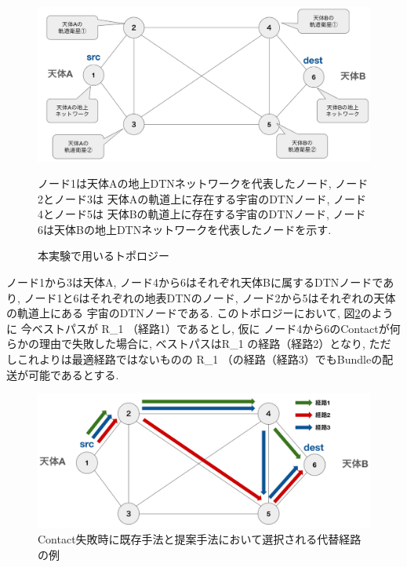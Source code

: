 \begin{figure}[tbh]
    \centering
    \includegraphics[width=0.7\textheight]{img/thesis_Sample_topology.pdf}
    \caption{本実験で用いるトポロジー}
    \label{fig:experimentation_topology}
    \begin{minipage}{\textwidth}
        \raggedright
        \vspace{3mm}
        \fontsize{10.5pt}{12pt}\selectfont
        ノード1は天体Aの地上DTNネットワークを代表したノード, ノード2とノード3は
        天体Aの軌道上に存在する宇宙のDTNノード, ノード4とノード5は
        天体Bの軌道上に存在する宇宙のDTNノード, 
        ノード6は天体Bの地上DTNネットワークを代表したノードを示す. 
    \end{minipage}
\end{figure}

ノード1から3は天体A, ノード4から6はそれぞれ天体Bに属するDTNノードであり, 
ノード1と6はそれぞれの地表DTNのノード, ノード2から5はそれぞれの天体の軌道上にある
宇宙のDTNノードである. 
このトポロジーにおいて, 図\ref{fig:example_of_routechange}のように
今ベストパスが R_{1   }（経路1）であるとし, 仮に
ノード4から6のContactが何らかの理由で失敗した場合に, 
ベストパスはR_{1   }の経路（経路2）となり, 
ただしこれよりは最適経路ではないものの
R_{1    }（の経路（経路3）でもBundleの配送が可能であるとする.

\begin{figure}[tbh]
    \centering
    \includegraphics[width=0.7\textheight]{img/example_of_routechange.pdf}
    \caption{Contact失敗時に既存手法と提案手法において選択される代替経路の例}
    \label{fig:example_of_routechange}
\end{figure}

